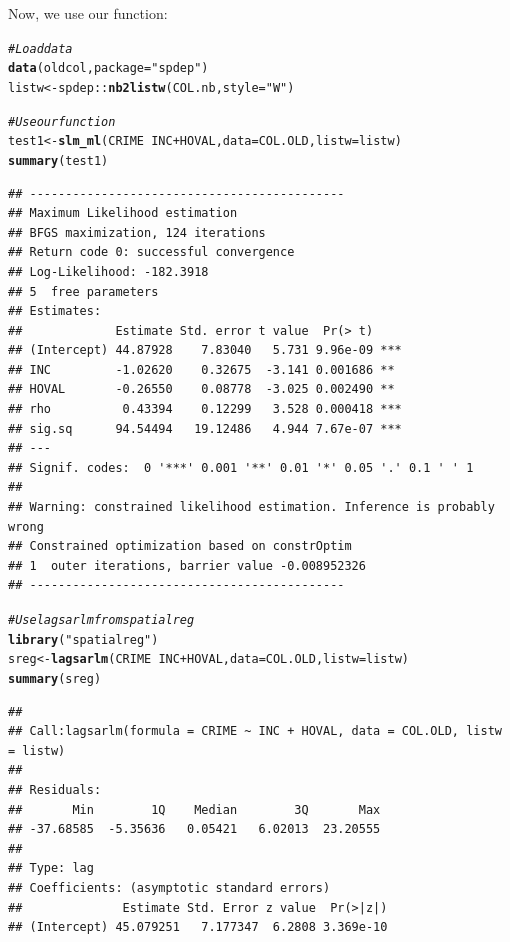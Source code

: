 \documentclass[english,12pt]{book}\usepackage[]{graphicx}\usepackage[]{xcolor}
\makeatletter
\newcommand{\hlstr}[1]{\textcolor[rgb]{0.192,0.494,0.8}{#1}}%
\newcommand{\hlcom}[1]{\textcolor[rgb]{0.678,0.584,0.686}{\textit{#1}}}%
\newcommand{\hlopt}[1]{\textcolor[rgb]{0,0,0}{#1}}%
\newcommand{\hlstd}[1]{\textcolor[rgb]{0.345,0.345,0.345}{#1}}%
\newcommand{\hlkwb}[1]{\textcolor[rgb]{0.69,0.353,0.396}{#1}}%
\newcommand{\hlkwc}[1]{\textcolor[rgb]{0.333,0.667,0.333}{#1}}%
\newcommand{\hlkwd}[1]{\textcolor[rgb]{0.737,0.353,0.396}{\textbf{#1}}}%
\newenvironment{kframe}{%
 \def\at@end@of@kframe{}%
 \ifinner\ifhmode%
  \def\at@end@of@kframe{\end{minipage}}%
  \begin{minipage}{\columnwidth}%
 \fi\fi%
 \def\FrameCommand##1{\hskip\@totalleftmargin \hskip-\fboxsep
 \colorbox{shadecolor}{##1}\hskip-\fboxsep
     \hskip-\linewidth \hskip-\@totalleftmargin \hskip\columnwidth}%
 \MakeFramed {\advance\hsize-\width
   \@totalleftmargin\z@ \linewidth\hsize
   \@setminipage}}%
 {\par\unskip\endMakeFramed%
 \at@end@of@kframe}
\newenvironment{knitrout}{}{} %
\makeatother
\begin{document}
Now, we use our function:

\begin{knitrout}
\color{fgcolor}\begin{kframe}
\begin{alltt}
\hlcom{# Load data }
\hlkwd{data}\hlstd{(oldcol,} \hlkwc{package}\hlstd{=}\hlstr{"spdep"}\hlstd{)}
\hlstd{listw} \hlkwb{<-} \hlstd{spdep}\hlopt{::}\hlkwd{nb2listw}\hlstd{(COL.nb,} \hlkwc{style} \hlstd{=} \hlstr{"W"}\hlstd{)}

\hlcom{# Use our function }
\hlstd{test1} \hlkwb{<-} \hlkwd{slm_ml}\hlstd{(CRIME} \hlopt{~} \hlstd{INC} \hlopt{+} \hlstd{HOVAL,} \hlkwc{data} \hlstd{= COL.OLD,} \hlkwc{listw} \hlstd{= listw)}
\hlkwd{summary}\hlstd{(test1)}
\end{alltt}
\begin{verbatim}
## --------------------------------------------
## Maximum Likelihood estimation
## BFGS maximization, 124 iterations
## Return code 0: successful convergence 
## Log-Likelihood: -182.3918 
## 5  free parameters
## Estimates:
##             Estimate Std. error t value  Pr(> t)    
## (Intercept) 44.87928    7.83040   5.731 9.96e-09 ***
## INC         -1.02620    0.32675  -3.141 0.001686 ** 
## HOVAL       -0.26550    0.08778  -3.025 0.002490 ** 
## rho          0.43394    0.12299   3.528 0.000418 ***
## sig.sq      94.54494   19.12486   4.944 7.67e-07 ***
## ---
## Signif. codes:  0 '***' 0.001 '**' 0.01 '*' 0.05 '.' 0.1 ' ' 1
## 
## Warning: constrained likelihood estimation. Inference is probably wrong
## Constrained optimization based on constrOptim 
## 1  outer iterations, barrier value -0.008952326 
## --------------------------------------------
\end{verbatim}
\begin{alltt}
\hlcom{# Use lagsarlm from spatialreg}
\hlkwd{library}\hlstd{(}\hlstr{"spatialreg"}\hlstd{)}
\hlstd{sreg} \hlkwb{<-} \hlkwd{lagsarlm}\hlstd{(CRIME} \hlopt{~} \hlstd{INC} \hlopt{+} \hlstd{HOVAL,} \hlkwc{data} \hlstd{= COL.OLD,} \hlkwc{listw} \hlstd{= listw)}
\hlkwd{summary}\hlstd{(sreg)}
\end{alltt}
\begin{verbatim}
## 
## Call:lagsarlm(formula = CRIME ~ INC + HOVAL, data = COL.OLD, listw = listw)
## 
## Residuals:
##       Min        1Q    Median        3Q       Max 
## -37.68585  -5.35636   0.05421   6.02013  23.20555 
## 
## Type: lag 
## Coefficients: (asymptotic standard errors) 
##              Estimate Std. Error z value  Pr(>|z|)
## (Intercept) 45.079251   7.177347  6.2808 3.369e-10

\end{verbatim}
\end{kframe}
\end{knitrout}
\end{document}
